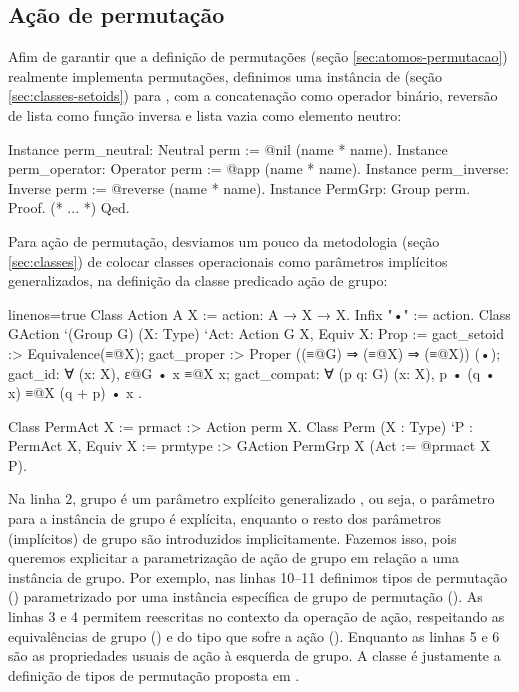 \subsection{Ação de permutação}
Afim de garantir que a definição de permutações (seção \ref{sec:atomos-permutacao}) realmente implementa permutações, definimos uma instância de  (seção \ref{sec:classes-setoids}) para , com a concatenação como operador binário, reversão de lista como função inversa e lista vazia como elemento neutro:
\begin{coqcode}
Instance perm_neutral: Neutral perm := @nil (name * name).
Instance perm_operator: Operator perm := @app (name * name).
Instance perm_inverse: Inverse perm := @reverse (name * name).
Instance PermGrp: Group perm. Proof. (* ... *) Qed.
\end{coqcode}

Para ação de permutação, desviamos um pouco da metodologia (seção \ref{sec:classes}) de colocar classes operacionais como parâmetros implícitos generalizados, na definição da classe predicado ação de grupo:
\begin{coqcode*}{linenos=true}
Class Action A X := action: A → X → X.    Infix "•" := action.
Class GAction `(Group G) (X: Type) `{Act: Action G X, Equiv X}: Prop := {
   gact_setoid :> Equivalence(≡@{X});
   gact_proper :> Proper ((≡@{G}) ⇒ (≡@{X}) ⇒ (≡@{X})) (•);
   gact_id: ∀ (x: X), ɛ@{G} • x ≡@{X} x;
   gact_compat: ∀ (p q: G) (x: X), p • (q • x) ≡@{X} (q + p) • x
}.

Class PermAct X := prmact :> Action perm X.
Class Perm (X : Type) `{P : PermAct X, Equiv X} := 
   prmtype :> GAction PermGrp X (Act := @prmact X P).
\end{coqcode*}
Na linha 2, grupo é um parâmetro explícito generalizado , ou seja, o parâmetro para a instância de grupo é explícita, enquanto o resto dos parâmetros (implícitos) de grupo são introduzidos implicitamente. Fazemos isso, pois queremos explicitar a parametrização de ação de grupo em relação a uma instância de grupo. Por exemplo, nas linhas 10--11 definimos tipos de permutação () parametrizado por uma instância específica de grupo de permutação (). As linhas 3 e 4 permitem reescritas no contexto da operação de ação, respeitando as equivalências de grupo () e do tipo que sofre a ação (). Enquanto as linhas 5 e 6 são as propriedades usuais de ação à esquerda de grupo. A classe  é justamente a definição de tipos de permutação proposta em \cite{Urban2008}.

